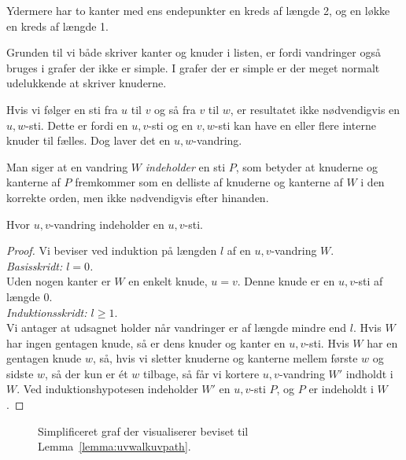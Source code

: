 Ydermere har to kanter med ens endepunkter en kreds af længde 2, og en løkke en kreds af længde 1.

Grunden til vi både skriver kanter og knuder i listen, er fordi vandringer også bruges i grafer der ikke er simple. I grafer der er simple er der meget normalt udelukkende at skriver knuderne.

Hvis vi følger en sti fra $u$ til $v$ og så fra $v$ til $w$, er resultatet ikke nødvendigvis en $u,w$-sti. Dette er fordi en $u,v$-sti og en $v,w$-sti kan have en eller flere interne knuder til fælles. Dog laver det en $u,w$-vandring.

Man siger at en vandring $W$ \textit{indeholder} en sti $P$, som betyder at knuderne og kanterne af $P$ fremkommer som en delliste af knuderne og kanterne af $W$ i den korrekte orden, men ikke nødvendigvis efter hinanden.

\begin{lemma}
	\label{lemma:uvwalkuvpath}
	Hvor $u,v$-vandring indeholder en $u,v$-sti.
\end{lemma}

\begin{proof}
	Vi beviser ved induktion på længden $l$ af en $u,v$-vandring $W$.\\
	\noindent
	\textit{Basisskridt: $l = 0$.} \\
	\noindent
	Uden nogen kanter er $W$ en enkelt knude, $u = v$. Denne knude er en $u,v$-sti af længde 0.\\
	\noindent
	\textit{Induktionsskridt: $l \ge 1$}. \\
	\noindent
	Vi antager at udsagnet holder når vandringer er af længde mindre end $l$. Hvis $W$ har ingen gentagen knude, så er dens knuder og kanter en $u,v$-sti. Hvis $W$ har en gentagen knude $w$, så, hvis vi sletter knuderne og kanterne mellem første $w$ og sidste $w$, så der kun er ét $w$ tilbage, så får vi  kortere $u,v$-vandring $W'$ indholdt i $W$. Ved induktionshypotesen indeholder $W'$ en $u,v$-sti $P$, og $P$ er indeholdt i $W$.
\end{proof}

\begin{figure}[ht]
	\centering
	\caption{\label{fig:bevispp21} Simplificeret graf der visualiserer beviset til Lemma~\ref{lemma:uvwalkuvpath}.}
\end{figure}

